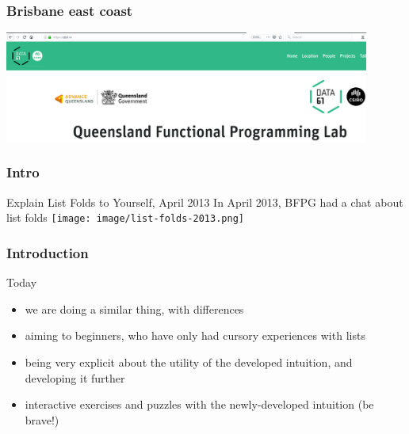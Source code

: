 \begin{frame}
\frametitle{Brisbane east coast}
\begin{center}
\includegraphics[width=0.9\textwidth]{image/qfpl_io.png}
\end{center}
\end{frame}

\begin{frame}
\frametitle{Intro}
\begin{block}{Explain List Folds to Yourself, April 2013}
In April 2013, BFPG had a chat about list folds
\texttt{[image: image/list-folds-2013.png]}
\end{block}
\end{frame}

\begin{frame}
\frametitle{Introduction}
\begin{block}{Today}
\begin{itemize}
\item<1-> we are doing a similar thing, with differences
\item<2-> aiming to beginners, who have only had cursory experiences with lists
\item<3-> being very explicit about the utility of the developed intuition, and developing it further
\item<4-> interactive exercises and puzzles with the newly-developed intuition (be brave!)
\end{itemize}
\end{block}
\end{frame}
